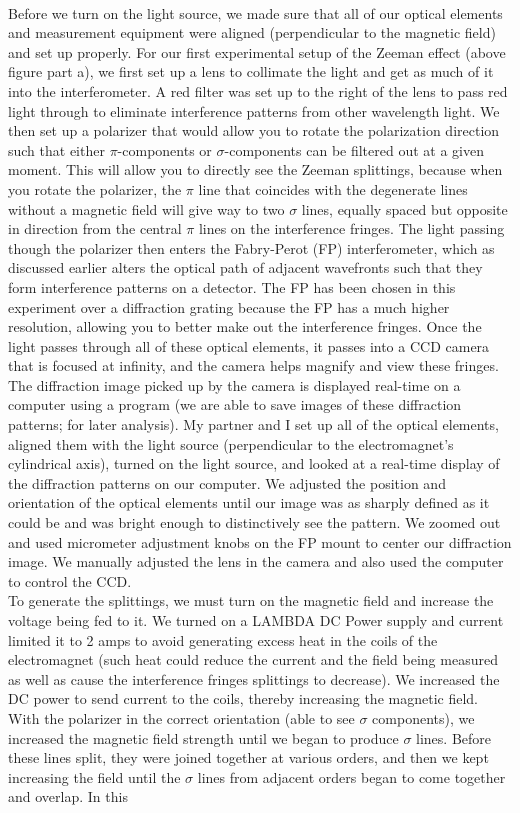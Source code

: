 \documentclass{article}
\begin{document}
    \\\indent Before we turn on the light source, we made sure that all of our optical elements and measurement equipment were aligned (perpendicular to the magnetic field) and set up properly. For our first experimental setup of the Zeeman effect (above figure part a), we first set up a lens to collimate the light and get as much of it into the interferometer. A red filter was set up to the right of the lens to pass red light through to eliminate interference patterns from other wavelength light. We then set up a polarizer that would allow you to rotate the polarization direction such that either $\pi$-components or $\sigma$-components can be filtered out at a given moment. This will allow you to directly see the Zeeman splittings, because when you rotate the polarizer, the $\pi$ line that coincides with the degenerate lines without a magnetic field will give way to two $\sigma$ lines, equally spaced but opposite in direction from the central $\pi$ lines on the interference fringes. The light passing though the polarizer then enters the Fabry-Perot (FP) interferometer, which as discussed earlier alters the optical path of adjacent wavefronts such that they form interference patterns on a detector. The FP has been chosen in this experiment over a diffraction grating because the FP has a much higher resolution, allowing you to better make out the interference fringes. Once the light passes through all of these optical elements, it passes into a CCD camera that is focused at infinity, and the camera helps magnify and view these fringes. The diffraction image picked up by the camera is displayed real-time on a computer using a program (we are able to save images of these diffraction patterns; for later analysis). My partner and I set up all of the optical elements, aligned them with the light source (perpendicular to the electromagnet's cylindrical axis), turned on the light source, and looked at a real-time display of the diffraction patterns on our computer. We adjusted the position and orientation of the optical elements until our image was as sharply defined as it could be and was bright enough to distinctively see the pattern. We zoomed out and used micrometer adjustment knobs on the FP mount to center our diffraction image. We manually adjusted the lens in the camera and also used the computer to control the CCD.\\\indent To generate the splittings, we must turn on the magnetic field and increase the voltage being fed to it. We turned on a LAMBDA DC Power supply and current limited it to 2 amps to avoid generating excess heat in the coils of the electromagnet (such heat could reduce the current and the field being measured as well as cause the interference fringes splittings to decrease). We increased the DC power to send current to the coils, thereby increasing the magnetic field. With the polarizer in the correct orientation (able to see $\sigma$ components), we increased the magnetic field strength until we began to produce $\sigma$ lines. Before these lines split, they were joined together at various orders, and then we kept increasing the field until the $\sigma$ lines from adjacent orders began to come together and overlap. In this 
\end{document}
